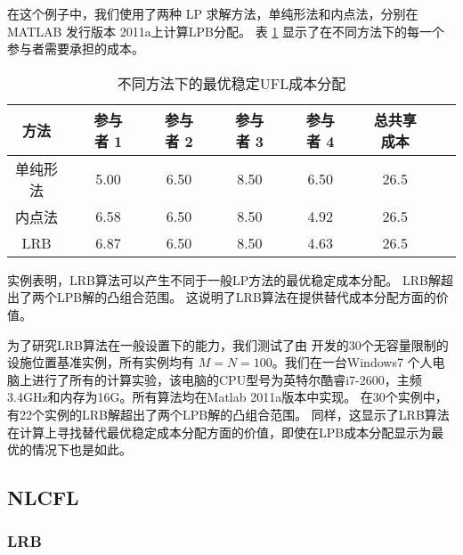 \documentclass[UTF8]{article}
\begin{document}
\begin{定义}
      在这个例子中，我们使用了两种 LP 求解方法，单纯形法和内点法，分别在 MATLAB 发行版本 2011a上计算LPB分配。
      表 \ref{table:UFLCA} 显示了在不同方法下的每一个参与者需要承担的成本。


      \begin{table}[H]
      \vspace{-2mm}
      \centering
      \tabcolsep=4pt
      \small
      \renewcommand\arraystretch{1.5}
      \caption{\label{table:UFLCA} 不同方法下的最优稳定UFL成本分配}
      \begin{tabular}[!h]{c c c c c c c c c c c c c}
      \hline
      \multicolumn{1}{c}{方法}
      &\multicolumn{1}{c}{}
      &\multicolumn{1}{c}{参与者 1}
      &\multicolumn{1}{c}{}
      &\multicolumn{1}{c}{参与者 2}
      &\multicolumn{1}{c}{}
      &\multicolumn{1}{c}{参与者 3} &\multicolumn{1}{c}{}
      &\multicolumn{1}{c}{参与者 4}	&\multicolumn{1}{c}{}
      &\multicolumn{1}{c}{总共享成本}\\
      \hline
      单纯形法	& &5.00	& &6.50	& &8.50	& &6.50	&	&26.5	&\\
      内点法	& &6.58	& &6.50	& &8.50	& &4.92	&	&26.5	&\\
      LRB	& &6.87	& &6.50	& &8.50	& &4.63	&	&26.5	&\\
      \hline
      \end{tabular}
      \vspace{-3mm}
      \end{table}

      实例表明，LRB算法可以产生不同于一般LP方法的最优稳定成本分配。
      LRB解超出了两个LPB解的凸组合范围。
      这说明了LRB算法在提供替代成本分配方面的价值。

      为了研究LRB算法在一般设置下的能力，我们测试了由 \cite{Benchmark} 开发的30个无容量限制的设施位置基准实例，所有实例均有 $ M=N=100$。我们在一台Windows7 个人电脑上进行了所有的计算实验，该电脑的CPU型号为英特尔酷睿i7-2600，主频3.4GHz和内存为16G。所有算法均在Matlab 2011a版本中实现。
      在30个实例中，有22个实例的LRB解超出了两个LPB解的凸组合范围。
      同样，这显示了LRB算法在计算上寻找替代最优稳定成本分配方面的价值，即使在LPB成本分配显示为最优的情况下也是如此。

    \subsection{NLCFL}


      \subsubsection{LRB}


\end{定义}
\end{document}
